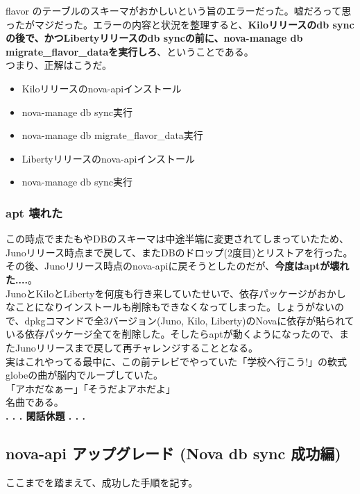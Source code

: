 \documentclass[9pt,b5paper,tombo,openany]{jsbook}
\begin{document}
flavor のテーブルのスキーマがおかしいという旨のエラーだった。嘘だろって思ったがマジだった。エラーの内容と状況を整理すると、\textbf{Kiloリリースのdb syncの後で、かつLibertyリリースのdb syncの前に、nova-manage db migrate\_flavor\_dataを実行しろ}、ということである。\\[1ex]

\noindent
つまり、正解はこうだ。

\begin{itemize}
	\item Kiloリリースのnova-apiインストール
	\item nova-manage db sync実行
	\item nova-manage db migrate\_flavor\_data実行
	\item Libertyリリースのnova-apiインストール
	\item nova-manage db sync実行
\end{itemize}


\subsubsection{apt 壊れた}
この時点でまたもやDBのスキーマは中途半端に変更されてしまっていたため、Junoリリース時点まで戻して、またDBのドロップ(2度目)とリストアを行った。その後、Junoリリース時点のnova-apiに戻そうとしたのだが、\textbf{今度はaptが壊れた....}。\\[1ex]

JunoとKiloとLibertyを何度も行き来していたせいで、依存パッケージがおかしなことになりインストールも削除もできなくなってしまった。しょうがないので、dpkgコマンドで全3バージョン(Juno, Kilo, Liberty)のNovaに依存が貼られている依存パッケージ全てを削除した。そしたらaptが動くようになったので、またJunoリリースまで戻して再チャレンジすることとなる。\\[1ex]

実はこれやってる最中に、この前テレビでやっていた「学校へ行こう!」の軟式globeの曲が脳内でループしていた。\\[1ex]

\noindent
「アホだなぁー」「そうだよアホだよ」\\[1ex]

\noindent
名曲である。\\[1ex]

\noindent
\textbf{. . . 閑話休題 . . .}


\subsection{nova-api アップグレード (Nova db sync 成功編)}
\noindent
ここまでを踏まえて、成功した手順を記す。\\[1ex]
\end{document}
